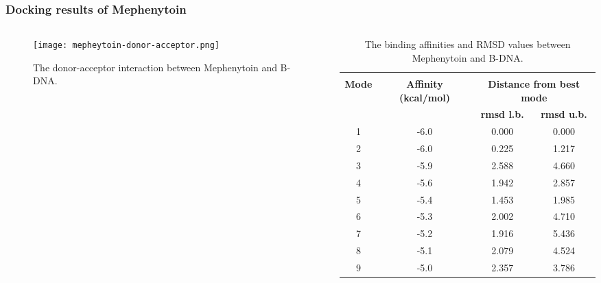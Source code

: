 \frametitle{Docking results of Mephenytoin}
\begin{columns}
	\begin{column}{0.6\linewidth}
		\begin{figure}
			\texttt{[image: mepheytoin-donor-acceptor.png]}
			\caption{\centering The donor-acceptor interaction \linebreak between Mephenytoin and B-DNA.}
			\label{fig:mph_donor_acceptor}
		\end{figure}
	\end{column}
	\begin{column}{0.45\linewidth}
		\centering
		\scriptsize
		\begin{table}
			\begin{tabular}{*{4}{c}}
				\hline\\[-1em]
				\multirow{2}{2em}{\centering\textbf{Mode}}&\multirow{2}{4em}{\centering\textbf{Affinity (kcal/mol)}}&\multicolumn{2}{c}{\centering\textbf{Distance from best mode}}\\
				\cline{3-4}
				&&\textbf{rmsd l.b.}&\textbf{rmsd u.b.}\\
				1&-6.0&0.000&0.000\\
				2&-6.0&0.225&1.217\\
				3&-5.9&2.588&4.660\\
				4&-5.6&1.942&2.857\\
				5&-5.4&1.453&1.985\\
				6&-5.3&2.002&4.710\\
				7&-5.2&1.916&5.436\\
				8&-5.1&2.079&4.524\\
				9&-5.0&2.357&3.786\\
				\hline
			\end{tabular}
			\caption{\centering The binding affinities and RMSD values between Mephenytoin and B-DNA.}
			\label{table:mph}
		\end{table}
	\end{column}
\end{columns}